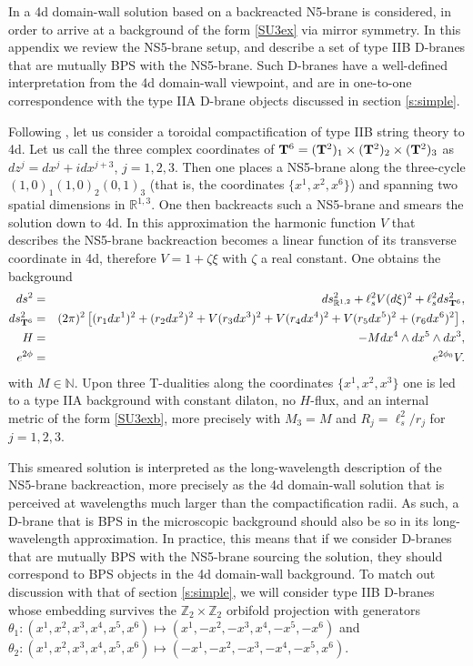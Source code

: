 \documentclass[11pt]{article}
\def\bea{\begin{eqnarray}}
\def\eea{\end{eqnarray}}
\newcommand{\IR}{\mathbb{R}}
\newcommand{\IZ}{\mathbb{Z}}
\begin{document}
In  \cite{Gurrieri:2002wz} a 4d domain-wall solution based on a backreacted N5-brane is considered, in order to arrive at a background of the form \eqref{SU3ex} via mirror symmetry. In this appendix we review the NS5-brane setup, and describe a set of type IIB D-branes that are mutually BPS with the NS5-brane. Such D-branes have a well-defined interpretation from the 4d domain-wall viewpoint, and are in one-to-one correspondence with the type IIA D-brane objects discussed in section \ref{s:simple}. 

Following  \cite{Gurrieri:2002wz}, let us consider a toroidal compactification of type IIB string theory to 4d. Let us call the three complex coordinates of ${\bf T}^6 = ({\bf T}^2)_1 \times ({\bf T}^2)_2 \times ({\bf T}^2)_3$ as $dz^j = dx^j + i dx^{j+3}$, $j=1,2,3$. Then one places a NS5-brane along the three-cycle $(1,0)_1(1,0)_2(0,1)_3$ (that is, the coordinates $\{x^1, x^2, x^6\}$) and spanning two spatial dimensions in $\IR^{1,3}$. One then backreacts such a NS5-brane and smears the solution down to 4d. In this approximation the harmonic function $V$ that describes the NS5-brane backreaction becomes a linear function of its transverse coordinate in 4d, therefore $V = 1+ \zeta \xi$ with $\zeta$ a real constant. One obtains the background
\bea
\label{Hex}
ds^2 &= &ds^2_{\IR^{1,2}}+ \ell_s^2 V(d\xi)^2 + \ell_s^2 ds^2_{{\bf T}^6}, \\
ds^2_{{\bf T}^6} & = & (2\pi)^2 \left[ (r_1 dx^1)^2+(r_2 dx^2)^2+V(r_3 dx^3)^2+V( r_4 dx^4)^2+V(r_5 dx^5)^2+(r_6 dx^6)^2 \right] , \\
H & = & - M dx^4 \wedge dx^5 \wedge dx^3, \\
e^{2\phi} & = & e^{2\phi_0} V .
\eea
with $M \in \mathbb{N}$. Upon three T-dualities along the coordinates $\{x^1, x^2, x^3\}$ one is led to a type IIA background with constant dilaton, no $H$-flux, and an internal metric of the form \eqref{SU3exb}, more precisely with $M_3=M$ and $R_j = \ell_s^2/r_j$ for $j=1,2,3$. 

This smeared solution is interpreted as the long-wavelength description of the NS5-brane backreaction, more precisely as the 4d domain-wall solution that is perceived at wavelengths much larger than the compactification radii. As such, a D-brane that is BPS in the microscopic background should also be so in its long-wavelength approximation. In practice, this means that if we consider D-branes that are mutually BPS with the NS5-brane sourcing the solution, they should correspond to BPS objects in the 4d domain-wall background. To match out discussion with that of section \ref{s:simple}, we will consider type IIB D-branes whose embedding survives the $\IZ_2 \times \IZ_2$ orbifold projection with generators $\theta_1: (x^1, x^2, x^3, x^4, x^5, x^6) \mapsto  (x^1, -x^2, -x^3, x^4, -x^5, -x^6)$ and $\theta_2: (x^1, x^2, x^3, x^4, x^5, x^6) \mapsto  (-x^1, -x^2, -x^3, -x^4, -x^5, x^6)$.
\end{document}
